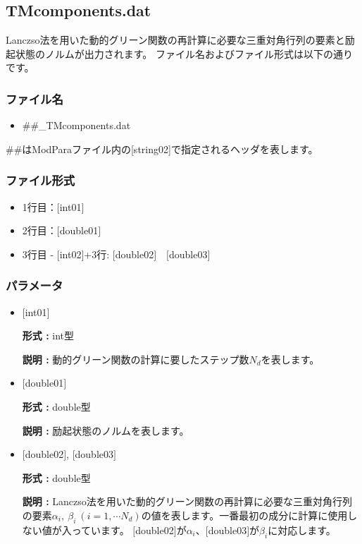 \newpage
\subsection{{TMcomponents.dat}}
Lanczso法を用いた動的グリーン関数の再計算に必要な三重対角行列の要素と励起状態のノルムが出力されます。
ファイル名およびファイル形式は以下の通りです。

\subsubsection{ファイル名}
\begin{itemize}
   \item{\#\#\_TMcomponents.dat}
\end{itemize}
  \#\#はModParaファイル内の[string02]で指定されるヘッダを表します。

\subsubsection{ファイル形式}
 \begin{itemize}
   \item  1行目：$[$int01$]$
   \item  2行目：$[$double01$]$
   \item  3行目 - $[$int02$]$+3行: $[$double02$]$~~$[$double03$]$
  \end{itemize}
\subsubsection{パラメータ}
 \begin{itemize}

  \item  $[$int01$]$

 {\bf 形式 :} int型

 {\bf 説明 :} 動的グリーン関数の計算に要したステップ数$N_d$を表します。

  \item  $[$double01$]$

 {\bf 形式 :} double型

{\bf 説明 :} 励起状態のノルムを表します。

 
 \item  $[$double02$]$, $[$double03$]$

 {\bf 形式 :} double型 

{\bf 説明 :} Lanczso法を用いた動的グリーン関数の再計算に必要な三重対角行列の要素$\alpha_i,~\beta_i~(i =1,\cdots N_d)$の値を表します。一番最初の成分に計算に使用しない値が入っています。
$[$double02$]$が$\alpha_i$、$[$double03$]$が$\beta_i$に対応します。\\
\end{itemize}

